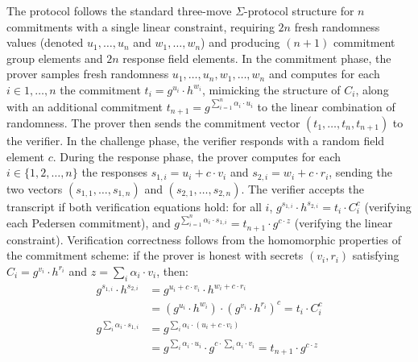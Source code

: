 The protocol follows the standard three-move $\Sigma$-protocol structure for $n$ commitments with a single linear constraint, requiring $2n$ fresh randomness values (denoted $u_1, \ldots, u_n$ and $w_1, \ldots, w_n$) and producing $(n+1)$ commitment group elements and $2n$ response field elements. In the commitment phase, the prover samples fresh randomness $u_1, \ldots, u_n, w_1, \ldots, w_n$ and computes for each $i \in {1, \ldots, n}$ the commitment $t_i = g^{u_i} \cdot h^{w_i}$, mimicking the structure of $C_i$, along with an additional commitment $t_{n+1} = g^{\sum_{i=1}^{n} \alpha_i \cdot u_i}$ to the linear combination of randomness. The prover then sends the commitment vector $(t_1, \ldots, t_n, t_{n+1})$ to the verifier. In the challenge phase, the verifier responds with a random field element $c$. During the response phase, the prover computes for each $i \in \{1, 2, \dots, n\}$ the responses $s_{1,i} = u_i + c \cdot v_i$ and $s_{2,i} = w_i + c \cdot r_i$, sending the two vectors $(s_{1,1}, \ldots, s_{1,n})$ and $(s_{2,1}, \ldots, s_{2,n})$. The verifier accepts the transcript if both verification equations hold: for all $i$, $g^{s_{1,i}} \cdot h^{s_{2,i}} = t_i \cdot C_i^c$ (verifying each Pedersen commitment), and $g^{\sum_{i=1}^{n} \alpha_i \cdot s_{1,i}} = t_{n+1} \cdot g^{c \cdot z}$ (verifying the linear constraint). Verification correctness follows from the homomorphic properties of the commitment scheme: if the
prover is honest with secrets $(v_i, r_i)$ satisfying $C_i = g^{v_i} \cdot h^{r_i}$ and
$z = \sum_i \alpha_i \cdot v_i$, then:
\begin{align*}
g^{s_{1,i}} \cdot h^{s_{2,i}} &= g^{u_i + c \cdot v_i} \cdot h^{w_i + c \cdot r_i} \\
&= (g^{u_i} \cdot h^{w_i}) \cdot (g^{v_i} \cdot h^{r_i})^c = t_i \cdot C_i^c \\
g^{\sum_i \alpha_i \cdot s_{1,i}} &= g^{\sum_i \alpha_i \cdot (u_i + c \cdot v_i)} \\
&= g^{\sum_i \alpha_i \cdot u_i} \cdot g^{c \cdot \sum_i \alpha_i \cdot v_i} = t_{n+1} \cdot g^{c \cdot z}
\end{align*}


